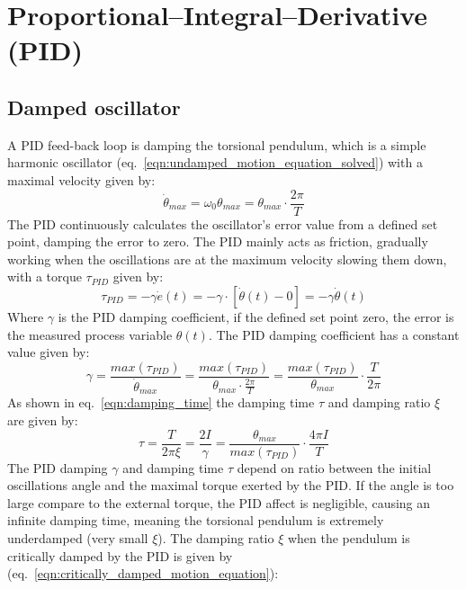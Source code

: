 \documentclass[\main/master.tex]{subfiles}
\begin{document}
\section{Proportional–Integral–Derivative (PID)}

\subsection{Damped oscillator}
A PID feed-back loop is damping the torsional pendulum, which is a simple harmonic oscillator (eq.~\ref{eqn:undamped_motion_equation_solved}) with a maximal velocity given by:
\begin{equation}
\dot{\theta}_{max} = \omega_0\theta_{max} = \theta_{max}\cdot\frac{2\pi}{T}    \label{eqn:undamped_motion_equation_3}
\end{equation}
The PID continuously calculates the oscillator's error value from a defined set point, damping the error to zero. The PID mainly acts as friction, gradually working when the oscillations are at the maximum velocity slowing them down, with a torque $\tau_{PID}$ given by:
\begin{equation}
\tau_{PID} = -\gamma\dot{e}(t) =  -\gamma\cdot [\dot{\theta}(t)-0]  =  -\gamma\dot{\theta}(t)  \label{eqn:friction_torque_pid}
\end{equation}
Where $\gamma$ is the PID damping coefficient, if the defined set point zero, the error is the measured process variable $\theta(t)$. The PID damping coefficient has a constant value given by:
\begin{equation}
\gamma  =  \frac{max(\tau_{PID})}{\dot{\theta}_{max}} =  \frac{max(\tau_{PID})}{\theta_{max}\cdot\frac{2\pi}{T}} =\frac{max(\tau_{PID})}{\theta_{max}}\cdot \frac{ T}{2\pi}          \label{eqn:damped_pid_motion_equation_2}
\end{equation}
As shown in eq.~\ref{eqn:damping_time} the damping time $\tau$ and damping ratio $\xi$ are given by:
\begin{equation}
\tau = \frac{T}{2 \pi \xi } =  \frac{2I}{\gamma} = \frac{\theta_{max}}{ max(\tau_{PID})} \cdot \frac{4\pi I}{T}  \label{eqn:damping_time_pid}
\end{equation}
The PID damping $\gamma$ and damping time $\tau$ depend on ratio between the initial oscillations angle and the maximal torque exerted by the PID. If the angle is too large compare to the external torque, the PID affect is negligible, causing an infinite damping time, meaning the torsional pendulum is extremely underdamped (very small $\xi$). The damping ratio $\xi$ when the pendulum is critically damped by the PID is given by (eq.~\ref{eqn:critically_damped_motion_equation}):
\end{document}
